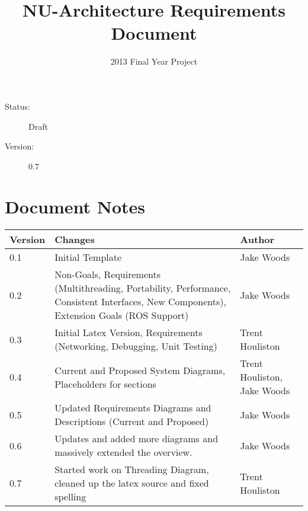 \documentclass[english,12pt]{scrartcl}
\title{NU-Architecture Requirements Document}
\author{2013 Final Year Project}
\begin{document}
    \maketitle
    \vfill
    {\large
        \begin{description}
            \item [Status:] Draft 
            \item [Version:] 0.7
        \end{description}}
 
    \clearpage
    \listoftodos
    \tableofcontents
    \clearpage
 
    \section{Document Notes}
        \begin{tabular}{ p{} | p{} | p{} }
            \textbf{Version} & \textbf{Changes} & \textbf{Author} \\ 
            \hline
            
            0.1 &
            Initial Template &
            Jake Woods \\
            \hline
            
            0.2 &
            Non-Goals, Requirements (Multithreading, Portability, Performance, Consistent
            Interfaces, New Components), Extension Goals (ROS Support) &
            Jake Woods \\
            \hline
            
            0.3 &
            Initial Latex Version, Requirements (Networking, Debugging, Unit Testing) &
            Trent Houliston \\
            \hline
                    
            0.4 &
            Current and Proposed System Diagrams, Placeholders for sections &
            Trent Houliston, Jake Woods \\
            \hline

            0.5 &
            Updated Requirements Diagrams and Descriptions (Current and Proposed) &
            Jake Woods \\
            \hline
            
            0.6 &
            Updates and added more diagrams and massively extended the overview. &
            Jake Woods \\
            \hline
            
            0.7 &
            Started work on Threading Diagram, cleaned up the latex source and fixed spelling &
            Trent Houliston \\
            \hline
        \end{tabular}
        
\end{document}
